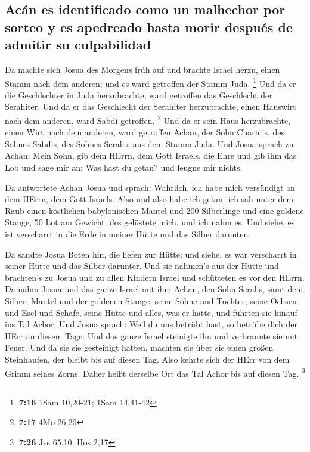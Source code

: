 \hypertarget{acuxe1n-es-identificado-como-un-malhechor-por-sorteo-y-es-apedreado-hasta-morir-despuuxe9s-de-admitir-su-culpabilidad}{%
\subsection{Acán es identificado como un malhechor por sorteo y es
apedreado hasta morir después de admitir su
culpabilidad}\label{acuxe1n-es-identificado-como-un-malhechor-por-sorteo-y-es-apedreado-hasta-morir-despuuxe9s-de-admitir-su-culpabilidad}}

 Da machte sich Josua des Morgens früh auf und brachte
Israel herzu, einen Stamm nach dem anderen; und es ward getroffen der
Stamm Juda. \footnote{\textbf{7:16} 1Sam 10,20-21; 1Sam 14,41-42}
 Und da er die Geschlechter in Juda herzubrachte, ward
getroffen das Geschlecht der Serahiter. Und da er das Geschlecht der
Serahiter herzubrachte, einen Hauswirt nach dem anderen, ward Sabdi
getroffen. \footnote{\textbf{7:17} 4Mo 26,20}  Und da er
sein Haus herzubrachte, einen Wirt nach dem anderen, ward getroffen
Achan, der Sohn Charmis, des Sohnes Sabdis, des Sohnes Serahs, aus dem
Stamm Juda.  Und Josua sprach zu Achan: Mein Sohn, gib
dem HErrn, dem Gott Israels, die Ehre und gib ihm das Lob und sage mir
an: Was hast du getan? und leugne mir nichts.

 Da antwortete Achan Josua und sprach: Wahrlich, ich habe
mich versündigt an dem HErrn, dem Gott Israels. Also und also habe ich
getan:  ich sah unter dem Raub einen köstlichen
babylonischen Mantel und 200 Silberlinge und eine goldene Stange, 50 Lot
am Gewicht; des gelüstete mich, und ich nahm es. Und siehe, es ist
verscharrt in die Erde in meiner Hütte und das Silber darunter.

 Da sandte Josua Boten hin, die liefen zur Hütte; und
siehe, es war verscharrt in seiner Hütte und das Silber darunter.
 Und sie nahmen's aus der Hütte und brachten's zu Josua
und zu allen Kindern Israel und schütteten es vor den HErrn.
 Da nahm Josua und das ganze Israel mit ihm Achan, den
Sohn Serahs, samt dem Silber, Mantel und der goldenen Stange, seine
Söhne und Töchter, seine Ochsen und Esel und Schafe, seine Hütte und
alles, was er hatte, und führten sie hinauf ins Tal Achor.
 Und Josua sprach: Weil du uns betrübt hast, so betrübe
dich der HErr an diesem Tage. Und das ganze Israel steinigte ihn und
verbrannte sie mit Feuer. Und da sie sie gesteinigt hatten,
 machten sie über sie einen großen Steinhaufen, der
bleibt bis auf diesen Tag. Also kehrte sich der HErr von dem Grimm
seines Zorns. Daher heißt derselbe Ort das Tal Achor bis auf diesen Tag.
\footnote{\textbf{7:26} Jes 65,10; Hos 2,17}

